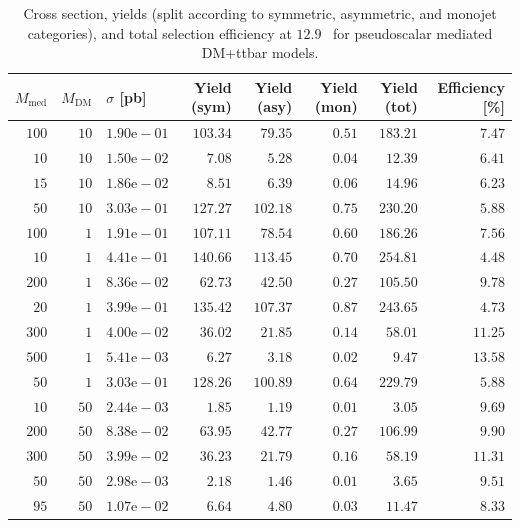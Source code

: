 \begin{table}
    \centering
    {\small
    \begin{tabular}{rrlrrrrr}
    \hline\hline
    $M_{\text{med}}$ & $M_{\text{DM}}$ & $\sigma$ [pb] & Yield (sym) & Yield (asy) & Yield (mon) & Yield (tot) & Efficiency [\%] \\
    \hline
    $100$ & $10$ & $1.90\text{e}-01$ & $103.34$ & $79.35$  & $0.51$ & $183.21$ & $7.47$  \\
    $10$  & $10$ & $1.50\text{e}-02$ & $7.08$   & $5.28$   & $0.04$ & $12.39$  & $6.41$  \\
    $15$  & $10$ & $1.86\text{e}-02$ & $8.51$   & $6.39$   & $0.06$ & $14.96$  & $6.23$  \\
    $50$  & $10$ & $3.03\text{e}-01$ & $127.27$ & $102.18$ & $0.75$ & $230.20$ & $5.88$  \\
    $100$ & $1$  & $1.91\text{e}-01$ & $107.11$ & $78.54$  & $0.60$ & $186.26$ & $7.56$  \\
    $10$  & $1$  & $4.41\text{e}-01$ & $140.66$ & $113.45$ & $0.70$ & $254.81$ & $4.48$  \\
    $200$ & $1$  & $8.36\text{e}-02$ & $62.73$  & $42.50$  & $0.27$ & $105.50$ & $9.78$  \\
    $20$  & $1$  & $3.99\text{e}-01$ & $135.42$ & $107.37$ & $0.87$ & $243.65$ & $4.73$  \\
    $300$ & $1$  & $4.00\text{e}-02$ & $36.02$  & $21.85$  & $0.14$ & $58.01$  & $11.25$ \\
    $500$ & $1$  & $5.41\text{e}-03$ & $6.27$   & $3.18$   & $0.02$ & $9.47$   & $13.58$ \\
    $50$  & $1$  & $3.03\text{e}-01$ & $128.26$ & $100.89$ & $0.64$ & $229.79$ & $5.88$  \\
    $10$  & $50$ & $2.44\text{e}-03$ & $1.85$   & $1.19$   & $0.01$ & $3.05$   & $9.69$  \\
    $200$ & $50$ & $8.38\text{e}-02$ & $63.95$  & $42.77$  & $0.27$ & $106.99$ & $9.90$  \\
    $300$ & $50$ & $3.99\text{e}-02$ & $36.23$  & $21.79$  & $0.16$ & $58.19$  & $11.31$ \\
    $50$  & $50$ & $2.98\text{e}-03$ & $2.18$   & $1.46$   & $0.01$ & $3.65$   & $9.51$  \\
    $95$  & $50$ & $1.07\text{e}-02$ & $6.64$   & $4.80$   & $0.03$ & $11.47$  & $8.33$  \\
    \hline\hline
    \end{tabular}
    }
    \caption{Cross section, yields (split according to symmetric, asymmetric, 
        and monojet categories), and total selection efficiency at $12.9$~\ifb 
        for pseudoscalar mediated DM+ttbar models.}
    \label{tab:DMttPS_yld}
\end{table}

